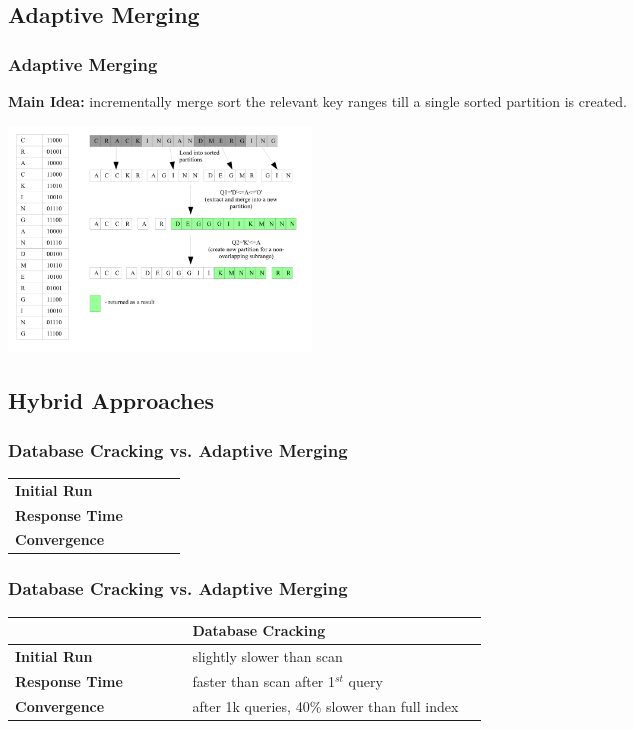 \documentclass{beamer}
\begin{document}
\subsection{Adaptive Merging}
\begin{frame}
\frametitle{Adaptive Merging}
\textbf{Main Idea: }incrementally merge sort the relevant key ranges till a single sorted partition is created. \pause
\begin{center}
\includegraphics[width=\linewidth, height=6cm, keepaspectratio]{graphics/merging.png}
\end{center}
\end{frame}

\subsection{Hybrid Approaches}
\begin{frame}
\frametitle{Database Cracking vs. Adaptive Merging}
\begin{tabular}{| M{0.2\linewidth} | }
\hline 
  \\ 
\hline 
\textbf{Initial Run} \\ 
\hline 
\textbf{Response Time} \\ 
\hline 
\textbf{Convergence} \\ 
\hline 
\end{tabular} 
\end{frame}

\begin{frame}
\frametitle{Database Cracking vs. Adaptive Merging}
\begin{tabular}{| M{0.2\linewidth} | M{0.35\linewidth} |}
\hline 
 & \textbf{Database Cracking} \\ 
\hline 
\textbf{Initial Run} & \color{green} slightly slower than scan \\ 
\hline 
\textbf{Response Time} & \color{green} faster than scan after 1$^{st}$ query \\ 
\hline 
\textbf{Convergence} & \color{red} after 1k queries, 40\% slower than full index  \\ 
\hline 
\end{tabular} 
\end{frame}
\end{document}
